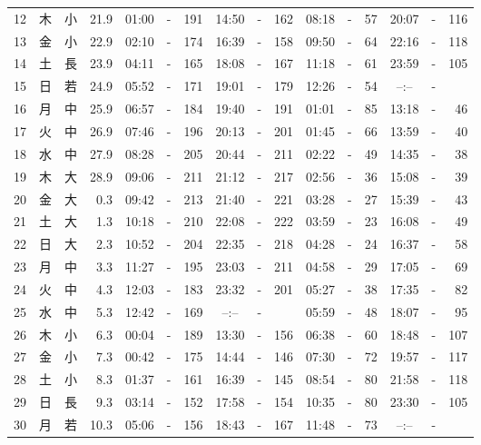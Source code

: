 \documentclass[12pt.a4j]{jsarticle}
\begin{document}
\begin{center}
\begin{table}[ht]
\begin{tabular}{|rc|cr|ccrccr|ccrccr|}
12 & 木 & 小 & 21.9 &  01:00 &-& 191  &  14:50 &-& 162  &   08:18 &-&  57  &   20:07 &-& 116  \\
13 & 金 & 小 & 22.9 &  02:10 &-& 174  &  16:39 &-& 158  &   09:50 &-&  64  &   22:16 &-& 118  \\
14 & 土 & 長 & 23.9 &  04:11 &-& 165  &  18:08 &-& 167  &   11:18 &-&  61  &   23:59 &-& 105  \\
15 & 日 & 若 & 24.9 &  05:52 &-& 171  &  19:01 &-& 179  &   12:26 &-&  54  &   --:-- &-&     \\
16 & 月 & 中 & 25.9 &  06:57 &-& 184  &  19:40 &-& 191  &   01:01 &-&  85  &   13:18 &-&  46  \\
17 & 火 & 中 & 26.9 &  07:46 &-& 196  &  20:13 &-& 201  &   01:45 &-&  66  &   13:59 &-&  40  \\
18 & 水 & 中 & 27.9 &  08:28 &-& 205  &  20:44 &-& 211  &   02:22 &-&  49  &   14:35 &-&  38  \\
19 & 木 & 大 & 28.9 &  09:06 &-& 211  &  21:12 &-& 217  &   02:56 &-&  36  &   15:08 &-&  39  \\
20 & 金 & 大 &  0.3 &  09:42 &-& 213  &  21:40 &-& 221  &   03:28 &-&  27  &   15:39 &-&  43  \\
21 & 土 & 大 &  1.3 &  10:18 &-& 210  &  22:08 &-& 222  &   03:59 &-&  23  &   16:08 &-&  49  \\
22 & 日 & 大 &  2.3 &  10:52 &-& 204  &  22:35 &-& 218  &   04:28 &-&  24  &   16:37 &-&  58  \\
23 & 月 & 中 &  3.3 &  11:27 &-& 195  &  23:03 &-& 211  &   04:58 &-&  29  &   17:05 &-&  69  \\
24 & 火 & 中 &  4.3 &  12:03 &-& 183  &  23:32 &-& 201  &   05:27 &-&  38  &   17:35 &-&  82  \\
25 & 水 & 中 &  5.3 &  12:42 &-& 169  &  --:-- &-&     &   05:59 &-&  48  &   18:07 &-&  95  \\
26 & 木 & 小 &  6.3 &  00:04 &-& 189  &  13:30 &-& 156  &   06:38 &-&  60  &   18:48 &-& 107  \\
27 & 金 & 小 &  7.3 &  00:42 &-& 175  &  14:44 &-& 146  &   07:30 &-&  72  &   19:57 &-& 117  \\
28 & 土 & 小 &  8.3 &  01:37 &-& 161  &  16:39 &-& 145  &   08:54 &-&  80  &   21:58 &-& 118  \\
29 & 日 & 長 &  9.3 &  03:14 &-& 152  &  17:58 &-& 154  &   10:35 &-&  80  &   23:30 &-& 105  \\
30 & 月 & 若 & 10.3 &  05:06 &-& 156  &  18:43 &-& 167  &   11:48 &-&  73  &   --:-- &-&     \\

\end{tabular}
\end{table}
\end{center}
\end{document}
